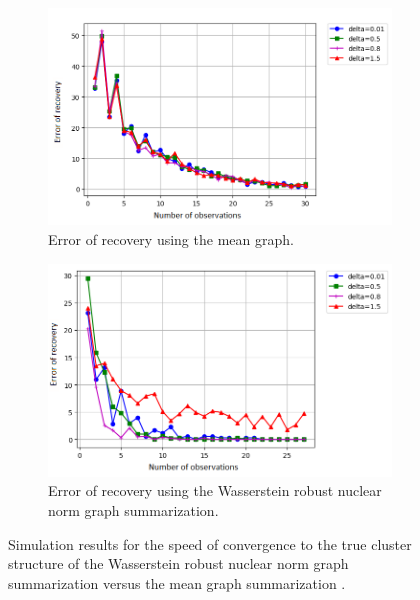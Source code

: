 \documentclass[12pt]{amsart}
\theoremstyle{remark}
\begin{document}
\begin{figure}
     \centering
     \begin{subfigure}[b]{0.8\textwidth}
         \centering
         \includegraphics[width=\textwidth]{./Pictures/speedMean.PNG}
         \caption{Error of recovery using the mean graph.}
     \end{subfigure}
     \hfill
     \begin{subfigure}[b]{0.8\textwidth}
         \centering
         \includegraphics[width=\textwidth]{./Pictures/speedspectral.PNG}
         \caption{Error of recovery using the Wasserstein robust nuclear norm graph summarization.}
     \end{subfigure}
	\caption{Simulation results for the speed of convergence to the true cluster structure of the Wasserstein robust nuclear norm graph summarization versus the mean graph summarization .}
        \label{fig:speed}
\end{figure}
\end{document}
